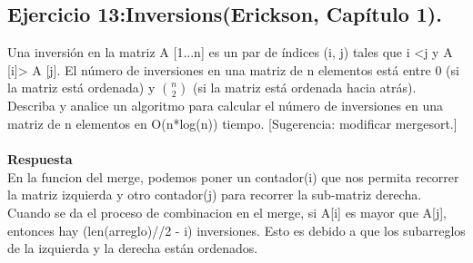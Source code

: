 \documentclass[a4paper,12pt]{article}
\begin{document}
\subsection{Ejercicio 13:Inversions(Erickson, Capítulo 1).}
Una inversión en la matriz A [1...n] es un par de índices (i, j) tales que i <j y A [i]> A [j]. El número de inversiones en una matriz de n elementos está entre 0 (si la matriz está ordenada) y $\binom{n}{2}$ (si la matriz está ordenada hacia atrás). Describa y analice un algoritmo para calcular el número de inversiones en una matriz de n elementos en O(n*log(n)) tiempo. [Sugerencia: modificar mergesort.]\\\\
\textbf{Respuesta}\\
En la funcion del merge, podemos poner un contador(i) que nos permita recorrer la matriz izquierda y otro contador(j) para recorrer la sub-matriz derecha. Cuando se da el proceso de combinacion en el merge, si A[i] es mayor que A[j], entonces hay (len(arreglo)//2 - i) inversiones. Esto es debido a que los subarreglos de la  izquierda y la derecha están ordenados.
\end{document}
